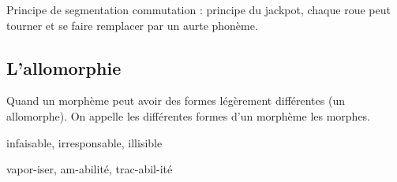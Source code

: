 \documentclass[a4paper]{report}
\theoremstyle{definition}
\theoremstyle{remark}
\begin{document}
Principe de segmentation commutation : principe du jackpot, chaque roue peut tourner et se faire remplacer par un aurte phonème. 

\subsection{L'allomorphie}

Quand un morphème peut avoir des formes légèrement différentes (un allomorphe). On appelle les différentes formes d'un morphème les morphes. \par

infaisable, irresponsable, illisible \par 

vapor-iser, am-abilité, trac-abil-ité
\end{document}
